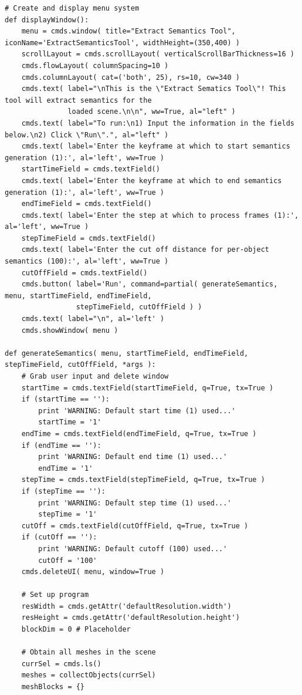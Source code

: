 \documentclass[conference]{IEEEtran}
\begin{document}
{{\begin{verbatim}
# Create and display menu system
def displayWindow():
    menu = cmds.window( title="Extract Semantics Tool", iconName='ExtractSemanticsTool', widthHeight=(350,400) )
    scrollLayout = cmds.scrollLayout( verticalScrollBarThickness=16 )
    cmds.flowLayout( columnSpacing=10 )
    cmds.columnLayout( cat=('both', 25), rs=10, cw=340 )
    cmds.text( label="\nThis is the \"Extract Sematics Tool\"! This tool will extract semantics for the
               loaded scene.\n\n", ww=True, al="left" )
    cmds.text( label="To run:\n1) Input the information in the fields below.\n2) Click \"Run\".", al="left" )
    cmds.text( label='Enter the keyframe at which to start semantics generation (1):', al='left', ww=True )
    startTimeField = cmds.textField()
    cmds.text( label='Enter the keyframe at which to end semantics generation (1):', al='left', ww=True )
    endTimeField = cmds.textField()
    cmds.text( label='Enter the step at which to process frames (1):', al='left', ww=True )
    stepTimeField = cmds.textField()
    cmds.text( label='Enter the cut off distance for per-object semantics (100):', al='left', ww=True )
    cutOffField = cmds.textField()
    cmds.button( label='Run', command=partial( generateSemantics, menu, startTimeField, endTimeField,
                 stepTimeField, cutOffField ) )
    cmds.text( label="\n", al='left' )
    cmds.showWindow( menu )

def generateSemantics( menu, startTimeField, endTimeField, stepTimeField, cutOffField, *args ):
    # Grab user input and delete window
    startTime = cmds.textField(startTimeField, q=True, tx=True )
    if (startTime == ''):
        print 'WARNING: Default start time (1) used...'
        startTime = '1'
    endTime = cmds.textField(endTimeField, q=True, tx=True )
    if (endTime == ''):
        print 'WARNING: Default end time (1) used...'
        endTime = '1'
    stepTime = cmds.textField(stepTimeField, q=True, tx=True )
    if (stepTime == ''):
        print 'WARNING: Default step time (1) used...'
        stepTime = '1'
    cutOff = cmds.textField(cutOffField, q=True, tx=True )
    if (cutOff == ''):
        print 'WARNING: Default cutoff (100) used...'
        cutOff = '100'
    cmds.deleteUI( menu, window=True )
    
    # Set up program
    resWidth = cmds.getAttr('defaultResolution.width')
    resHeight = cmds.getAttr('defaultResolution.height')
    blockDim = 0 # Placeholder
                
    # Obtain all meshes in the scene
    currSel = cmds.ls()
    meshes = collectObjects(currSel)
    meshBlocks = {}
    

\end{verbatim}}}
\end{document}
